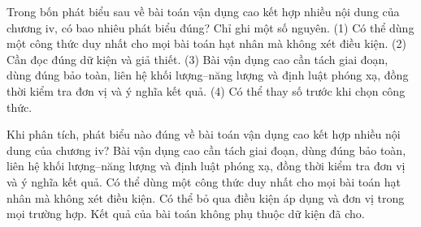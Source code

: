 \begin{ex}
Trong bốn phát biểu sau về bài toán vận dụng cao kết hợp nhiều nội dung của chương iv, có bao nhiêu phát biểu đúng? Chỉ ghi một số nguyên. (1) Có thể dùng một công thức duy nhất cho mọi bài toán hạt nhân mà không xét điều kiện. (2) Cần đọc đúng dữ kiện và giả thiết. (3) Bài vận dụng cao cần tách giai đoạn, dùng đúng bảo toàn, liên hệ khối lượng–năng lượng và định luật phóng xạ, đồng thời kiểm tra đơn vị và ý nghĩa kết quả. (4) Có thể thay số trước khi chọn công thức.
\end{ex}

\begin{ex}
Khi phân tích, phát biểu nào đúng về bài toán vận dụng cao kết hợp nhiều nội dung của chương iv?
\choice
{\True Bài vận dụng cao cần tách giai đoạn, dùng đúng bảo toàn, liên hệ khối lượng–năng lượng và định luật phóng xạ, đồng thời kiểm tra đơn vị và ý nghĩa kết quả.}
{Có thể dùng một công thức duy nhất cho mọi bài toán hạt nhân mà không xét điều kiện.}
{Có thể bỏ qua điều kiện áp dụng và đơn vị trong mọi trường hợp.}
{Kết quả của bài toán không phụ thuộc dữ kiện đã cho.}
\end{ex}

